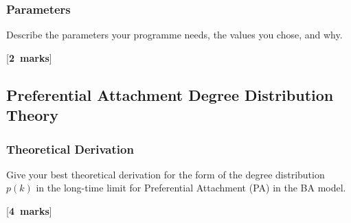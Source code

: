 \documentclass[a4paper,12pt]{article}
\newcounter{nmarks}
\newcommand{\qmarks}[1]{\addtocounter{nmarks}{#1} }
\renewcommand{\qmarks}[1]{\addtocounter{nmarks}{#1} \hspace*{\fill} [\textbf{#1~marks}]}
\begin{document}
\subsubsection{Parameters}
Describe the parameters your programme needs, the values you chose, and why. \qmarks{2}



\subsection{Preferential Attachment Degree Distribution Theory}

\subsubsection{Theoretical Derivation}
Give your best theoretical derivation for the form of the degree distribution $p(k)$ in the long-time limit for Preferential Attachment (PA) in the BA model. \qmarks{4}
\end{document}
